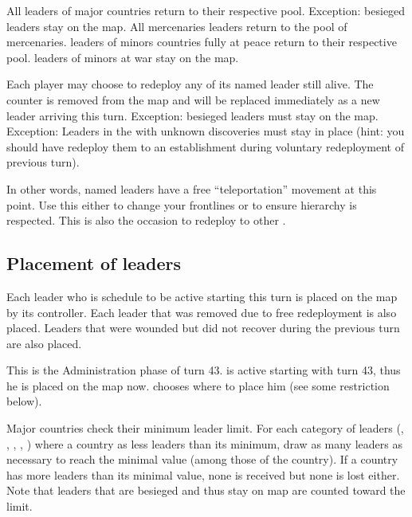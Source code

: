 \aparag[Anonymous]
\bparag All \anonyme leaders of major countries return to their respective
pool.
\bparag Exception: besieged leaders stay on the map.
\bparag All mercenaries leaders return to the pool of mercenaries.
\bparag \anonyme leaders of minors countries fully at peace return to their
respective pool.
\bparag \anonyme leaders of minors at war stay on the map.

Each player may choose to redeploy any of its named leader still alive. The
counter is removed from the map and will be replaced immediately as a new
leader arriving this turn.
\bparag Exception: besieged leaders must stay on the map.
\bparag Exception: Leaders in the \ROTW with unknown discoveries must stay in
place (hint: you should have redeploy them to an establishment during
voluntary redeployment of previous turn).

\begin{playtip}
  In other words, named leaders have a free ``teleportation'' movement at this
  point. Use this either to change your frontlines or to ensure hierarchy is
  respected. This is also the occasion to redeploy \LeaderGov to other \Areas.
\end{playtip}

\subsection{Placement of leaders}
Each leader who is schedule to be active starting this turn is placed on the
map by its controller.
\bparag Each leader that was removed due to free redeployment is also placed.
\bparag Leaders that were wounded but did not recover during the previous turn
are also placed.

\begin{exemple}
  This is the Administration phase of turn 43.  is
  active starting with turn 43, thus he is placed on the map now. \ANG chooses
  where to place him (see some restriction below).
\end{exemple}

\aparag[Anonymous] Major countries check their minimum leader limit.
\bparag For each category of leaders (\LeaderG, \LeaderA, \LeaderE, \LeaderC,
\LeaderGov) where a country as less leaders than its minimum, draw as many
\anonyme leaders as necessary to reach the minimal value (among those of the
country).
\bparag If a country has more leaders than its minimal value, none is
received but none is lost either.
\bparag Note that \anonyme leaders that are besieged and thus stay on map are
counted toward the limit.

